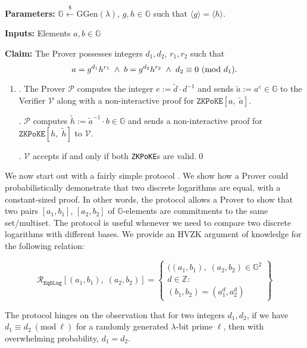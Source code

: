 \documentclass[11pt, lettersize, notitlepage, leqno, footskip=0.6cm]{article}
\newcommand{\ttt}{\texttt}
\newcommand{\bG}{\mathbb{G}}
\newcommand{\la}{\langle}
\newcommand{\ra}{\rangle}
\newcommand{\wti}{\widetilde}
\newcommand{\mc}{\mathcal}
\newcommand{\mb}{\mathbb}
\newcommand{\mr}{\mathrm}
\newcommand{\lam}{\lambda}
\newcommand{\lamb}{\lambda}
\newcommand{\mP}{\mc{P}}
\newcommand{\V}{\mc{V}}
\newcommand{\vs}{\vspace{-0.15cm}}
\newcommand{\noin}{\noindent}
\newcommand{\op}{overwhelming probability}
\newcommand{\Mod}[1]{\ (\mathrm{mod}\ #1)}
\numberwithin{equation}{section}
\begin{document}
\noin \textbf{Parameters:} $\mb{G}\xleftarrow{\$} \mr{GGen}(\lamb)$,  $g,h\in \mb{G}$ such that $\la g \ra = \la h \ra$.

\noin \textbf{Inputs:} Elements $a,b\in\bG$

\noin \textbf{Claim:} The Prover possesses integers $d_1,d_2$, $r_1,r_2$ such that \vs $$a = g^{d_1}h^{r_1} \;\wedge\; b = g^{d_2}h^{r_2} \;\wedge\; d_2\equiv 0\Mod{d_1} . \vs $$

\begin{enumerate}[wide, labelwidth=!, labelindent=0pt]\vs \item


\noin 1. The Prover $\mP$ computes the integer $e:= \wti{d}\cdot{d}^{-1}$ and sends $\wti{a}:= a^{e}\in \bG$ to the Verifier $\V$ along with a non-interactive proof for $\ttt{ZKPoKE}[a,\;\wti{a}]$.

\noin 2. $\mP$ computes $\wti{h}:= \wti{a}^{-1}\cdot b\in \bG$ and sends a non-interactive proof for $\ttt{ZKPoKE}[h,\;\wti{h}]$ to $\V$.

\noin 3. $\V$ accepts if and only if both \verb|ZKPoKE|s are valid.\qed \end{enumerate}


  

We now start out with a fairly simple protocol . We show how a Prover could probabilistically demonstrate that two discrete logarithms are equal, with a constant-sized proof. In other words, the protocol allows a Prover to show that two pairs $[a_1, b_1]$, $[a_2, b_2]$ of $\bG$-elements are commitments to the same set/multiset. The protocol is useful whenever we need to compare two discrete logarithms with different bases. We provide an HVZK argument of knowledge for  the following relation:\vs

\[
  \mc{R}_{\ttt{EqDLog}}[(a_1, b_1),\;(a_2,b_2)] = \left\{\begin{array}{l}
    ((a_1, b_1),\; (a_2,b_2)\in\mb{G}^2\\
    d\in\mb{Z}: \\
    (b_1,b_2) = (a_1^d,a_2^d)
  \end{array}\right\}
\] \vspace{0.1cm}

\noin The protocol hinges on the observation that for two integers $d_1,d_2$, if we have $d_1\equiv d_2\Mod{\ell}$ for a randomly generated $\lam$-bit prime $\ell$, then with \op, $d_1= d_2$.

\vspace{0.15cm}
\end{document}
